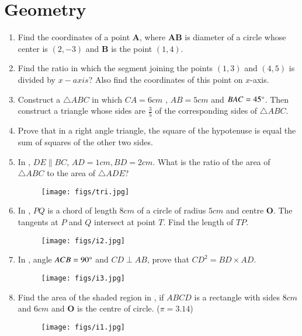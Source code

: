 \documentclass[12pt,-letter paper]{article}
\let\vec\mathbf{}
\let\vec\mathbf{}
\let\vec\mathbf{}
\providecommand{\brak}[1]{\ensuremath{\left(#1\right)}}\graphicspath{{/storage/self/primary/Download/latexnew/fig}}
\begin{document}
\section{Geometry}
\begin{enumerate}
\item Find the coordinates of a point $\vec{A}$, where $\vec{AB}$ is diameter of a circle whose center is $\brak{2,-3}$ and $\vec{B}$ is the point $\brak{1,4}$.
\item Find the ratio in which the segment joining the points $\brak{1, 3}$ and $\brak{4, 5}$ is divided by $x-axis$? Also find the coordinates of this point on  $x$-axis.
\item Construct a $\triangle ABC$ in which $CA = 6cm$ , $AB = 5cm$ and $BAC= 45\degree$. Then  construct a triangle whose sides are $\frac{3}{5}$ of the corresponding sides of $\triangle ABC$.
\item Prove that in a right angle triangle, the square of the hypotenuse is equal the sum of squares of the other two sides.
\item In , $DE \parallel BC$, $ AD = 1 cm , BD = 2 cm$. What is the ratio of the area of $\triangle ABC$ to the area of $\triangle ADE$?
\begin{figure}[H]
			\centering
			\texttt{[image: figs/tri.jpg]}
			\caption{}
			\label{fig:figure1}
			
			
		\end{figure}  
\item In , $PQ$ is a chord of length $8 cm$ of a circle of radius $5 cm$ and centre $\vec{O}$. The tangents at $P$ and $Q$ intersect at point $T$. Find the length of $TP$.
\begin{figure}[H]                                             \centering
         \texttt{[image: figs/i2.jpg]}
			\caption{}
			\label{fig:figure2}

                \end{figure}
\item In , angle $ACB = 90\degree$ and $CD \perp AB$, prove that $CD ^ 2 = BD \times AD$.
\begin{figure}[H]                                                            \centering
                        \texttt{[image: figs/i3.jpg]}
			\caption{}
			\label{fig:figure3}
                \end{figure}
\item Find the area of the shaded region in , if $ABCD$ is a rectangle with sides $8 cm$ and $6 cm$ and $\vec{O}$ is the centre of circle. ($\pi = 3.14$)
\begin{figure}[H]                                     \centering
	\texttt{[image: figs/i1.jpg]}
		\caption{}
		\label{fig:figure4}


\end{figure}
\end{enumerate}
\end{document}
